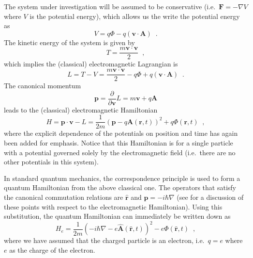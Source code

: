 The system under investigation will be assumed to be conservative (i.e.\ $\mathbf{F} = -\nabla V$ where $V$ is the potential energy), which allows us the write the potential energy as
$$
V = q\Phi - q\left(\mathbf{v}\cdot\mathbf{A}\right)\;\;.
$$
The kinetic energy of the system is given by
$$
T = \frac{m\mathbf{v}\cdot\mathbf{v}}{2}\;\;,
$$
which implies the (classical) electromagnetic Lagrangian is
$$
L = T-V = \frac{m\mathbf{v}\cdot\mathbf{v}}{2} - q\Phi + q\left(\mathbf{v}\cdot\mathbf{A}\right)\;\;.
$$ 
The canonical momentum
$$
\mathbf{p} = \frac{\partial}{\partial\mathbf{v}}L = m\mathbf{v}+q\mathbf{A}
$$
leads to the (classical) electromagnetic Hamiltonian
$$
H = \mathbf{p}\cdot\mathbf{v}-L = \frac{1}{2m}\left(\mathbf{p}-q\mathbf{A}(\mathbf{r},t)\right)^2+q\Phi(\mathbf{r},t)\;\;,
$$
where the explicit dependence of the potentials on position and time has again been added for emphasis.  Notice that this Hamiltonian is for a single particle with a potential governed solely by the electromagnetic field (i.e.\ there are no other potentials in this system).

In standard quantum mechanics, the correspondence principle is used to form a quantum Hamiltonian from the above classical one.  The operators that satisfy the canonical commutation relations are $\hat{\mathbf{r}}$ and $\hat{\mathbf{p}} = -i\hbar\nabla$ (see \cite{Cohen1997} for a discussion of these points with respect to the electromagnetic Hamiltonian).  Using this substitution, the quantum Hamiltonian can immediately be written down as
$$
H_e = \frac{1}{2m}\left(-i\hbar\nabla-e\hat{\mathbf{A}}(\hat{\mathbf{r}},t)\right)^2 -e\Phi(\hat{\mathbf{r}},t)\;\;,
$$
where we have assumed that the charged particle is an electron, i.e.\ $q=e$ where $e$ as the charge of the electron.  

